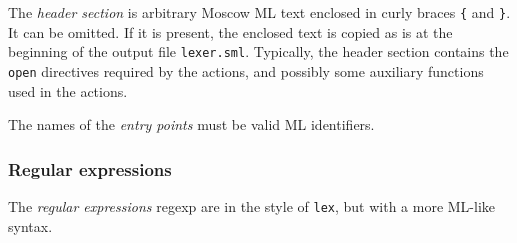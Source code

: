 \documentclass[fleqn,a4paper]{article}
\begin{document}
The \emph{header section} is arbitrary Moscow ML text enclosed in curly
braces \verb#{# and \verb#}#.  It can be omitted.  If it is present,
the enclosed text is copied as is at the beginning of the output file
{\tt lexer.sml}.  Typically, the header section contains the {\tt
  open} directives required by the actions, and possibly some
auxiliary functions used in the actions.

The names of the \emph{entry points} must be valid ML identifiers.


\subsubsection{Regular expressions}

The \emph{regular expressions} regexp are in the style of {\tt lex},
but with a more ML-like syntax.
\end{document}
